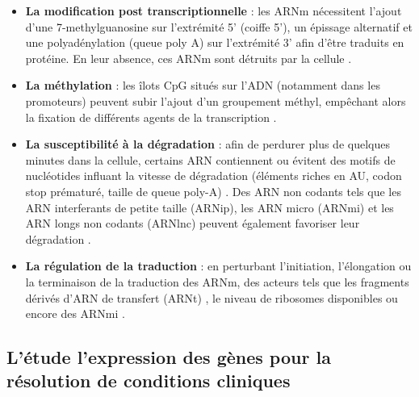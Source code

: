 \begin{itemize}
    \item \textbf{La modification post transcriptionnelle} : les ARNm nécessitent l'ajout d'une 7-methylguanosine sur l'extrémité 5' (coiffe 5'), un épissage alternatif et une polyadénylation (queue poly A) sur l'extrémité 3' afin d'être traduits en protéine. En leur absence, ces ARNm sont détruits par la cellule \cite{Mercer2010Nov}.
    \item \textbf{La méthylation} : les îlots CpG situés sur l'ADN (notamment dans les promoteurs) peuvent subir l'ajout d'un groupement méthyl, empêchant alors la fixation de différents agents de la transcription \cite{Gutierrez-Arcelus2013Jun}.
    \item \textbf{La susceptibilité à la dégradation} : afin de perdurer plus de quelques minutes dans la cellule, certains ARN contiennent ou évitent des motifs de nucléotides influant la vitesse de dégradation (éléments riches en AU, codon stop prématuré, taille de queue poly-A) \cite{Yu2001}. Des ARN non codants tels que les ARN interferants de petite taille (ARNip), les ARN micro (ARNmi) et les ARN longs non codants (ARNlnc) peuvent également favoriser leur dégradation \cite{Patil2014Jan}.
    \item \textbf{La régulation de la traduction} : en perturbant l'initiation, l'élongation ou la terminaison de la traduction des ARNm, des acteurs tels que les fragments dérivés d'ARN de transfert (ARNt) \cite{Krishna2021Mar}, le niveau de ribosomes disponibles \cite{Khajuria2018Mar} ou encore des ARNmi \cite{Meijer2013Apr}.
\end{itemize}







\subsection{L'étude l'expression des gènes pour la résolution de conditions cliniques}


